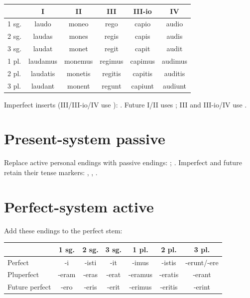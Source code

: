 \begin{center}\small
\begin{tabular}{@{}lccccc@{}}
  \toprule & I & II & III & III-io & IV \\
  \midrule
  1 sg. & laudo & moneo & rego & capio & audio \\
  2 sg. & laudas & mones & regis & capis & audis \\
  3 sg. & laudat & monet & regit & capit & audit \\
  1 pl. & laudamus & monemus & regimus & capimus & audimus \\
  2 pl. & laudatis & monetis & regitis & capitis & auditis \\
  3 pl. & laudant & monent & regunt & capiunt & audiunt \\
  \bottomrule
\end{tabular}
\end{center}

Imperfect inserts  (III/III-io/IV use ):
. Future I/II uses
; III and III-io/IV use
.

\section{Present-system passive}

Replace active personal endings with passive endings:
;
. Imperfect and
future retain their tense markers: , ,
.

\section{Perfect-system active}


Add these endings to the perfect stem:

\begin{center}
\begin{tabular}{@{}lcccccc@{}}
  \toprule & 1 sg. & 2 sg. & 3 sg. & 1 pl. & 2 pl. & 3 pl. \\
  \midrule
  Perfect & -i & -isti & -it & -imus & -istis & -erunt/-ere \\
  Pluperfect & -eram & -eras & -erat & -eramus & -eratis & -erant \\
  Future perfect & -ero & -eris & -erit & -erimus & -eritis & -erint \\
  \bottomrule
\end{tabular}
\end{center}

